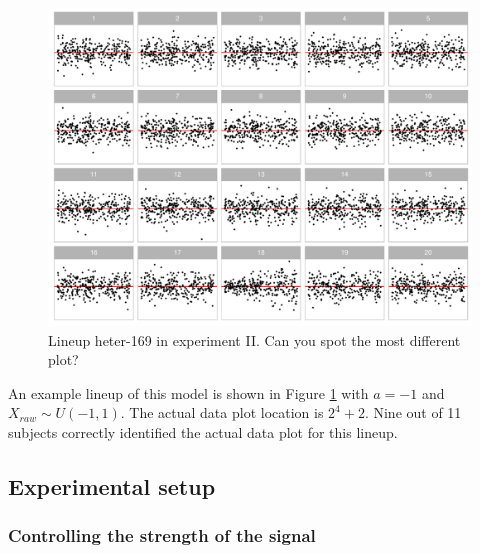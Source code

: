 \documentclass[]{interact}
\theoremstyle{plain}%
\theoremstyle{definition}
\theoremstyle{remark}
\begin{document}
\begin{figure}

{\centering \includegraphics[width=1\linewidth]{paper_comparison_files/figure-latex/example-heter-lineup-1} 

}

\caption{Lineup heter-169 in experiment II. Can you spot the most different plot? \label{fig:example-heter-lineup}}\label{fig:example-heter-lineup}
\end{figure}

An example lineup of this model is shown in Figure
\ref{fig:example-heter-lineup} with \(a = -1\) and
\(X_{raw} \sim U(-1, 1)\). The actual data plot location is \(2^4 + 2\).
Nine out of 11 subjects correctly identified the actual data plot for
this lineup.

\hypertarget{experimental-setup}{%
\subsection{Experimental setup}\label{experimental-setup}}

\hypertarget{controlling-the-strength-of-the-signal}{%
\subsubsection{Controlling the strength of the
signal}\label{controlling-the-strength-of-the-signal}}
\end{document}
